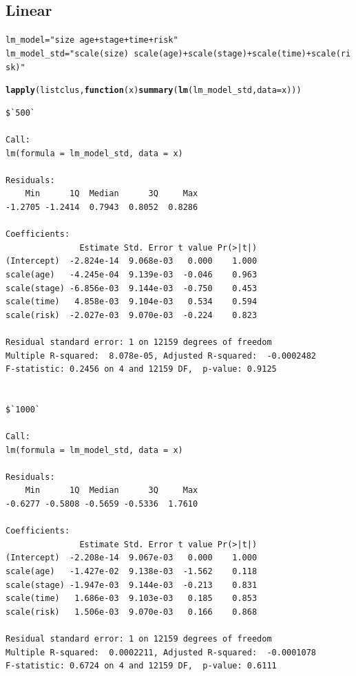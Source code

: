 \documentclass[]{revtex4}\usepackage[]{graphicx}\usepackage[]{color}
\makeatletter
\newcommand{\hlstr}[1]{\textcolor[rgb]{0.192,0.494,0.8}{#1}}%
\newcommand{\hlstd}[1]{\textcolor[rgb]{0.345,0.345,0.345}{#1}}%
\newcommand{\hlkwa}[1]{\textcolor[rgb]{0.161,0.373,0.58}{\textbf{#1}}}%
\newcommand{\hlkwb}[1]{\textcolor[rgb]{0.69,0.353,0.396}{#1}}%
\newcommand{\hlkwc}[1]{\textcolor[rgb]{0.333,0.667,0.333}{#1}}%
\newcommand{\hlkwd}[1]{\textcolor[rgb]{0.737,0.353,0.396}{\textbf{#1}}}%
\newenvironment{kframe}{%
 \def\at@end@of@kframe{}%
 \ifinner\ifhmode%
  \def\at@end@of@kframe{\end{minipage}}%
  \begin{minipage}{\columnwidth}%
 \fi\fi%
 \def\FrameCommand##1{\hskip\@totalleftmargin \hskip-\fboxsep
 \colorbox{shadecolor}{##1}\hskip-\fboxsep
     \hskip-\linewidth \hskip-\@totalleftmargin \hskip\columnwidth}%
 \MakeFramed {\advance\hsize-\width
   \@totalleftmargin\z@ \linewidth\hsize
   \@setminipage}}%
 {\par\unskip\endMakeFramed%
 \at@end@of@kframe}
\newenvironment{knitrout}{}{} %
\makeatother
\begin{document}
\subsection{Linear}
\begin{knitrout}
\color{fgcolor}\begin{kframe}
\begin{alltt}
\hlstd{lm_model} \hlkwb{=} \hlstr{"size ~ age + stage + time + risk"}
\hlstd{lm_model_std} \hlkwb{=} \hlstr{"scale(size) ~ scale(age) + scale(stage) + scale(time) + scale(risk)"}

\hlkwd{lapply}\hlstd{(listclus,} \hlkwa{function}\hlstd{(}\hlkwc{x}\hlstd{)} \hlkwd{summary}\hlstd{(}\hlkwd{lm}\hlstd{(lm_model_std,} \hlkwc{data} \hlstd{= x)))}
\end{alltt}
\begin{verbatim}
$`500`

Call:
lm(formula = lm_model_std, data = x)

Residuals:
    Min      1Q  Median      3Q     Max 
-1.2705 -1.2414  0.7943  0.8052  0.8286 

Coefficients:
               Estimate Std. Error t value Pr(>|t|)
(Intercept)  -2.824e-14  9.068e-03   0.000    1.000
scale(age)   -4.245e-04  9.139e-03  -0.046    0.963
scale(stage) -6.856e-03  9.144e-03  -0.750    0.453
scale(time)   4.858e-03  9.104e-03   0.534    0.594
scale(risk)  -2.027e-03  9.070e-03  -0.224    0.823

Residual standard error: 1 on 12159 degrees of freedom
Multiple R-squared:  8.078e-05,	Adjusted R-squared:  -0.0002482 
F-statistic: 0.2456 on 4 and 12159 DF,  p-value: 0.9125


$`1000`

Call:
lm(formula = lm_model_std, data = x)

Residuals:
    Min      1Q  Median      3Q     Max 
-0.6277 -0.5808 -0.5659 -0.5336  1.7610 

Coefficients:
               Estimate Std. Error t value Pr(>|t|)
(Intercept)  -2.208e-14  9.067e-03   0.000    1.000
scale(age)   -1.427e-02  9.138e-03  -1.562    0.118
scale(stage) -1.947e-03  9.144e-03  -0.213    0.831
scale(time)   1.686e-03  9.103e-03   0.185    0.853
scale(risk)   1.506e-03  9.070e-03   0.166    0.868

Residual standard error: 1 on 12159 degrees of freedom
Multiple R-squared:  0.0002211,	Adjusted R-squared:  -0.0001078 
F-statistic: 0.6724 on 4 and 12159 DF,  p-value: 0.6111



\end{verbatim}
\end{kframe}
\end{knitrout}
\end{document}
